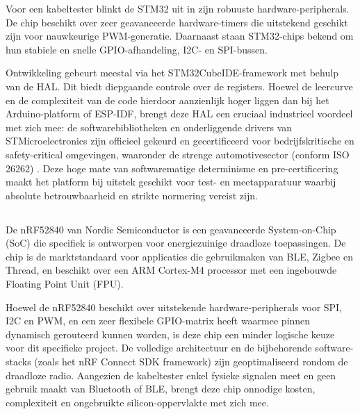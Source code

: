 Voor een kabeltester blinkt de STM32 uit in zijn robuuste hardware-peripherals. De chip beschikt over zeer geavanceerde hardware-timers die uitstekend geschikt zijn voor nauwkeurige \acrshort{PWM}-generatie. Daarnaast staan STM32-chips bekend om hun stabiele en snelle \acrshort{GPIO}-afhandeling, \acrshort{I2C}- en \acrshort{SPI}-bussen. 

Ontwikkeling gebeurt meestal via het STM32CubeIDE-framework met behulp van de \gls{HAL}. Dit biedt diepgaande controle over de registers. Hoewel de leercurve en de complexiteit van de code hierdoor aanzienlijk hoger liggen dan bij het Arduino-platform of \gls{ESP-IDF}, brengt deze \gls{HAL} een cruciaal industrieel voordeel met zich mee: de softwarebibliotheken en onderliggende drivers van STMicroelectronics zijn officieel gekeurd en gecertificeerd voor bedrijfskritische en safety-critical omgevingen, waaronder de strenge automotivesector (conform \gls{ISO} 26262) \autocite{STMicroelectronics2026, STMicroelectronics2023}. Deze hoge mate van softwarematige determinisme en pre-certificering maakt het platform bij uitstek geschikt voor test- en meetapparatuur waarbij absolute betrouwbaarheid en strikte normering vereist zijn.

\subsection{}%
\label{ssec:Nordic nRF52840}

De nRF52840 van Nordic Semiconductor \autocite{NSA2024} is een geavanceerde System-on-Chip (SoC) die specifiek is ontworpen voor energiezuinige draadloze toepassingen. De chip is de marktstandaard voor applicaties die gebruikmaken van \gls{BLE}, Zigbee en Thread, en beschikt over een ARM Cortex-M4 processor met een ingebouwde Floating Point Unit (FPU).

Hoewel de nRF52840 beschikt over uitstekende hardware-peripherals voor \gls{SPI}, \gls{I2C} en \gls{PWM}, en een zeer flexibele \gls{GPIO}-matrix heeft waarmee pinnen dynamisch gerouteerd kunnen worden, is deze chip een minder logische keuze voor dit specifieke project. De volledige architectuur en de bijbehorende software-stacks (zoals het nRF Connect SDK framework) zijn geoptimaliseerd rondom de draadloze radio. Aangezien de kabeltester enkel fysieke signalen meet en geen gebruik maakt van Bluetooth of BLE, brengt deze chip onnodige kosten, complexiteit en ongebruikte silicon-oppervlakte met zich mee.

\subsection{}%
\label{ssec:µCController}

